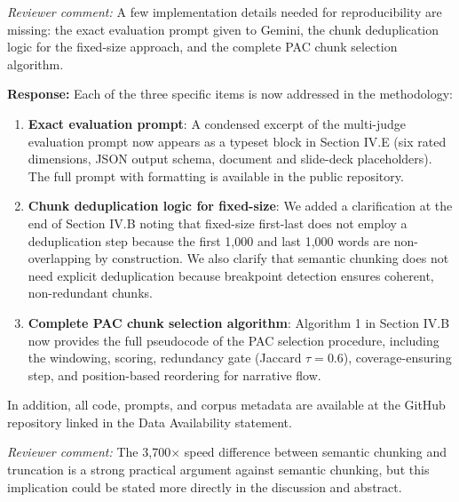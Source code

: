 \documentclass[11pt]{article}
\newcommand{\rcomment}[1]{\noindent\textcolor{revcomment}{\textit{Reviewer comment:}} #1\medskip}
\newcommand{\rresponse}[1]{\noindent\textcolor{response}{\textbf{Response:}} #1\medskip\medskip}
\begin{document}
\rcomment{A few implementation details needed for reproducibility are missing: the exact evaluation prompt given to Gemini, the chunk deduplication logic for the fixed-size approach, and the complete PAC chunk selection algorithm.}

\rresponse{Each of the three specific items is now addressed in the methodology:
\begin{enumerate}
    \item \textbf{Exact evaluation prompt}: A condensed excerpt of the multi-judge evaluation prompt now appears as a typeset block in Section IV.E (six rated dimensions, JSON output schema, document and slide-deck placeholders). The full prompt with formatting is available in the public repository.
    \item \textbf{Chunk deduplication logic for fixed-size}: We added a clarification at the end of Section IV.B noting that fixed-size first-last does not employ a deduplication step because the first 1{,}000 and last 1{,}000 words are non-overlapping by construction. We also clarify that semantic chunking does not need explicit deduplication because breakpoint detection ensures coherent, non-redundant chunks.
    \item \textbf{Complete PAC chunk selection algorithm}: Algorithm 1 in Section IV.B now provides the full pseudocode of the PAC selection procedure, including the windowing, scoring, redundancy gate (Jaccard $\tau = 0.6$), coverage-ensuring step, and position-based reordering for narrative flow.
\end{enumerate}
In addition, all code, prompts, and corpus metadata are available at the GitHub repository linked in the Data Availability statement.}

\rcomment{The 3{,}700$\times$ speed difference between semantic chunking and truncation is a strong practical argument against semantic chunking, but this implication could be stated more directly in the discussion and abstract.}
\end{document}
